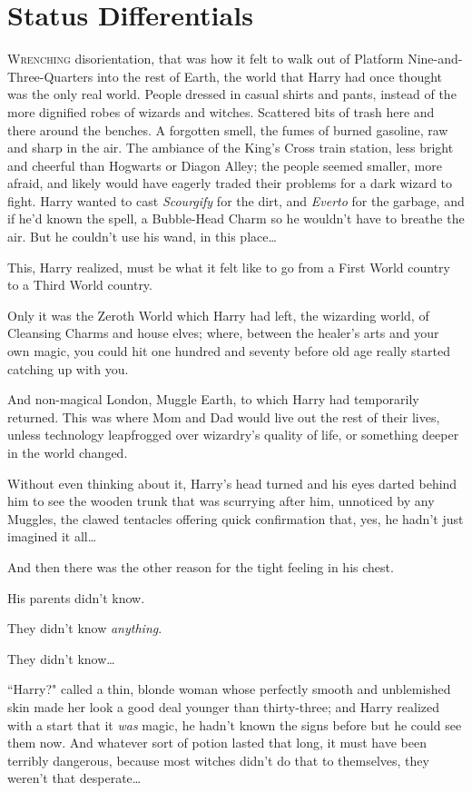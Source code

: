 \chapter{Status Differentials}

\lettrine{W}{renching} disorientation, that was how it felt to walk out of Platform Nine-and-Three-Quarters into the rest of Earth, the world that Harry had once thought was the only real world. People dressed in casual shirts and pants, instead of the more dignified robes of wizards and witches. Scattered bits of trash here and there around the benches. A forgotten smell, the fumes of burned gasoline, raw and sharp in the air. The ambiance of the King's Cross train station, less bright and cheerful than Hogwarts or Diagon Alley; the people seemed smaller, more afraid, and likely would have eagerly traded their problems for a dark wizard to fight. Harry wanted to cast \emph{Scourgify} for the dirt, and \emph{Everto} for the garbage, and if he'd known the spell, a Bubble-Head Charm so he wouldn't have to breathe the air. But he couldn't use his wand, in this place{\ldots}

This, Harry realized, must be what it felt like to go from a First World country to a Third World country.

Only it was the Zeroth World which Harry had left, the wizarding world, of Cleansing Charms and house elves; where, between the healer's arts and your own magic, you could hit one hundred and seventy before old age really started catching up with you.

And non-magical London, Muggle Earth, to which Harry had temporarily returned. This was where Mom and Dad would live out the rest of their lives, unless technology leapfrogged over wizardry's quality of life, or something deeper in the world changed.

Without even thinking about it, Harry's head turned and his eyes darted behind him to see the wooden trunk that was scurrying after him, unnoticed by any Muggles, the clawed tentacles offering quick confirmation that, yes, he hadn't just imagined it all{\ldots}

And then there was the other reason for the tight feeling in his chest.

His parents didn't know.

They didn't know \emph{anything}.

They didn't know{\ldots}

``Harry?" called a thin, blonde woman whose perfectly smooth and unblemished skin made her look a good deal younger than thirty-three; and Harry realized with a start that it \emph{was} magic, he hadn't known the signs before but he could see them now. And whatever sort of potion lasted that long, it must have been terribly dangerous, because most witches didn't do that to themselves, they weren't that desperate{\ldots}


